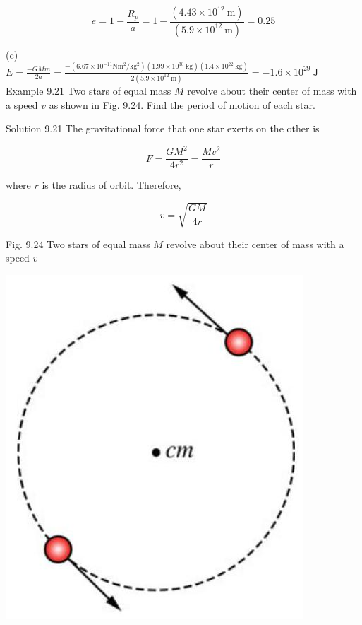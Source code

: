 \documentclass[10pt]{article}
\begin{document}
$$
e=1-\frac{R_{p}}{a}=1-\frac{\left(4.43 \times 10^{12} \mathrm{~m}\right)}{\left(5.9 \times 10^{12} \mathrm{~m}\right)}=0.25
$$

(c)\\
$E=\frac{-G M m}{2 a}=\frac{-\left(6.67 \times 10^{-11} \mathrm{Nm}^{2} / \mathrm{kg}^{2}\right)\left(1.99 \times 10^{30} \mathrm{~kg}\right)\left(1.4 \times 10^{22} \mathrm{~kg}\right)}{2\left(5.9 \times 10^{12} \mathrm{~m}\right)}=-1.6 \times 10^{29} \mathrm{~J}$\\
Example 9.21 Two stars of equal mass $M$ revolve about their center of mass with a speed $v$ as shown in Fig. 9.24. Find the period of motion of each star.

Solution 9.21 The gravitational force that one star exerts on the other is

$$
F=\frac{G M^{2}}{4 r^{2}}=\frac{M v^{2}}{r}
$$

where $r$ is the radius of orbit. Therefore,

$$
v=\sqrt{\frac{G M}{4 r}}
$$

Fig. 9.24 Two stars of equal mass $M$ revolve about their center of mass with a speed $v$

\begin{center}
\includegraphics[max width=\textwidth]{2024_09_13_db1f357d2aad0a03eb2eg-160}
\end{center}
\end{document}
